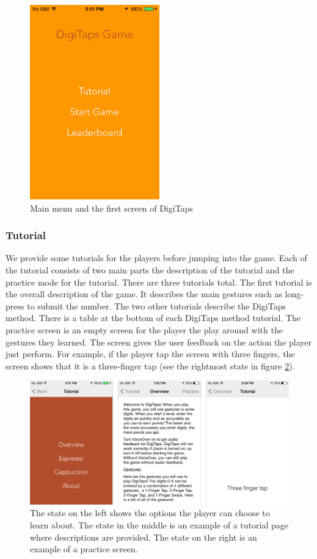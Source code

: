 \begin{figure}[ht!]
  \centering
  \includegraphics[width=0.5\textwidth]{figures/start.png}
  \caption{Main menu and the first screen of DigiTaps}
  \label{startscreen}
\end{figure}

\subsubsection{Tutorial}
    We provide some tutorials for the players before jumping into the game. Each of the tutorial consists of two main parts the description of the tutorial and the practice mode for the tutorial. There are three tutorials total. The first tutorial is the overall description of the game. It describes the main gestures such as long-press to submit the number. The two other tutorials describe the DigiTaps method. There is a table at the bottom of each DigiTaps method tutorial. The practice screen is an empty screen for the player the play around with the gestures they learned. The screen gives the user feedback on the action the player just perform. For example, if the player tap the screen with three fingers, the screen shows that it is a three-finger tap (see the rightmost state in figure \ref{tutorial}).

\begin{figure}[ht!]
  \centering
  \includegraphics[width=1.0\textwidth]{figures/tutorial.png}
  \caption{The state on the left shows the options the player can choose to learn about. The state in the middle is an example of a tutorial page where descriptions are provided. The state on the right is an example of a practice screen.}
  \label{tutorial}
\end{figure}

